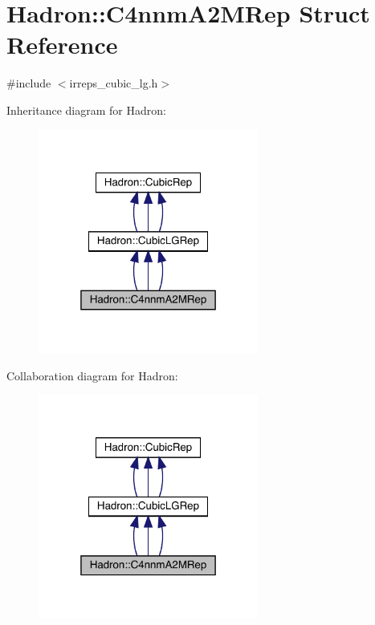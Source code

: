\hypertarget{structHadron_1_1C4nnmA2MRep}{}\section{Hadron\+:\+:C4nnm\+A2\+M\+Rep Struct Reference}
\label{structHadron_1_1C4nnmA2MRep}


{\ttfamily \#include $<$irreps\+\_\+cubic\+\_\+lg.\+h$>$}



Inheritance diagram for Hadron\+:
\nopagebreak
\begin{figure}[H]
\begin{center}
\leavevmode
\includegraphics[width=205pt]{da/d54/structHadron_1_1C4nnmA2MRep__inherit__graph}
\end{center}
\end{figure}


Collaboration diagram for Hadron\+:
\nopagebreak
\begin{figure}[H]
\begin{center}
\leavevmode
\includegraphics[width=205pt]{d6/d31/structHadron_1_1C4nnmA2MRep__coll__graph}
\end{center}
\end{figure}
